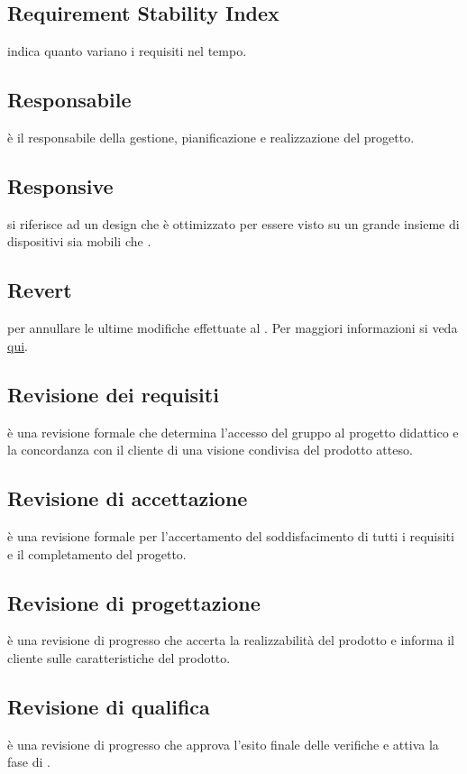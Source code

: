 \documentclass[12pt,a4paper]{article}
\begin{document}
\subsection{Requirement Stability Index} 
indica quanto variano i requisiti nel tempo.

\subsection{Responsabile} 
è il responsabile della gestione, pianificazione e realizzazione del progetto.

\subsection{Responsive} 
si riferisce ad un design che è ottimizzato per essere visto su un grande insieme di dispositivi sia mobili che .

\subsection{Revert} 
per annullare le ultime modifiche effettuate al . Per maggiori informazioni si veda \href{https://git-scm.com/docs/}{qui}.

\subsection{Revisione dei requisiti} 
è una revisione formale che determina l'accesso del gruppo al progetto didattico e la concordanza con il cliente di una visione condivisa del prodotto atteso.

\subsection{Revisione di accettazione} 
è una revisione formale per l'accertamento del soddisfacimento di tutti i requisiti e il completamento del progetto.

\subsection{Revisione di progettazione} 
è una revisione di progresso che accerta la realizzabilità del prodotto e informa il cliente sulle caratteristiche del prodotto.

\subsection{Revisione di qualifica} 
è una revisione di progresso che approva l'esito finale delle verifiche e attiva la fase di .
\end{document}
